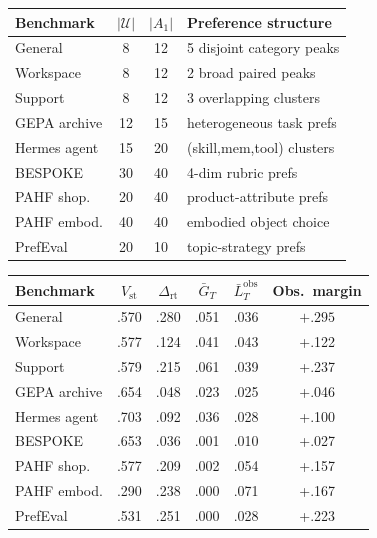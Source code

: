 \documentclass{article} %
\begin{document}
\begin{table}[t]
\centering
\small
\begin{minipage}{0.48\textwidth}
\centering
\begingroup
\scriptsize
\setlength{\tabcolsep}{2.5pt}
\begin{tabular}{lccl}
\toprule
\textbf{Benchmark} & $|\mathcal{U}|$ & $|A_1|$ & Preference structure \\
\midrule
General       &  8 & 12 & 5 disjoint category peaks \\
Workspace     &  8 & 12 & 2 broad paired peaks \\
Support       &  8 & 12 & 3 overlapping clusters \\
GEPA archive  & 12 & 15 & heterogeneous task prefs \\
Hermes agent  & 15 & 20 & (skill,mem,tool) clusters \\
BESPOKE       & 30 & 40 & 4-dim rubric prefs \\
PAHF shop.    & 20 & 40 & product-attribute prefs \\
PAHF embod.   & 40 & 40 & embodied object choice \\
PrefEval      & 20 & 10 & topic-strategy prefs \\
\bottomrule
\end{tabular}
\endgroup
{}
\label{tab:envs}
\end{minipage}
\hfill
\begin{minipage}{0.50\textwidth}
\centering
\begingroup
\scriptsize
\setlength{\tabcolsep}{2.5pt}
\begin{tabular}{lccccc}
\toprule
\textbf{Benchmark} & $V_{\mathrm{st}}$ & $\Delta_{\mathrm{rt}}$ & $\bar G_T$ & $\bar L_T^{\mathrm{obs}}$ & \textbf{Obs.\ margin} \\
\midrule
General       & .570 & .280 & .051 & .036 & $\mathbf{+.295}$ \\
Workspace     & .577 & .124 & .041 & .043 & +.122 \\
Support       & .579 & .215 & .061 & .039 & +.237 \\
GEPA archive  & .654 & .048 & .023 & .025 & +.046 \\
Hermes agent  & .703 & .092 & .036 & .028 & +.100 \\
BESPOKE       & .653 & .036 & .001 & .010 & +.027 \\
PAHF shop.    & .577 & .209 & .002 & .054 & +.157 \\
PAHF embod.   & .290 & .238 & .000 & .071 & +.167 \\
PrefEval      & .531 & .251 & .000 & .028 & +.223 \\
\bottomrule
\end{tabular}
\endgroup
{}
\label{tab:main}\label{tab:e6-decomp}
\end{minipage}
\end{table}
\end{document}
